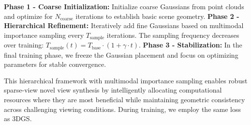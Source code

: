 \documentclass{article}
\begin{document}
  \noindent\textbf{Phase 1 - Coarse Initialization:} Initialize coarse Gaussians from point clouds and optimize for $N_{\text{coarse}}$ iterations to establish basic scene geometry.
  \textbf{Phase 2 - Hierarchical Refinement:} Iteratively add fine Gaussians based on multimodal importance sampling every $T_{\text{sample}}$ iterations. The sampling frequency decreases over training:
  $T_{\text{sample}}(t) = T_{\text{base}} \cdot (1 + \gamma \cdot t).$
  \textbf{Phase 3 - Stabilization:} In the final training phase, we freeze the Gaussian placement and focus on optimizing parameters for stable convergence.
  
  This hierarchical framework with multimodal importance sampling enables robust sparse-view novel view synthesis by intelligently allocating computational resources where they are most beneficial while maintaining geometric consistency across challenging viewing conditions. During training, we employ the same loss as 3DGS\cite{kerbl20233d}.
  
  
    
  
  
  
    
  
  
  
\end{document}
